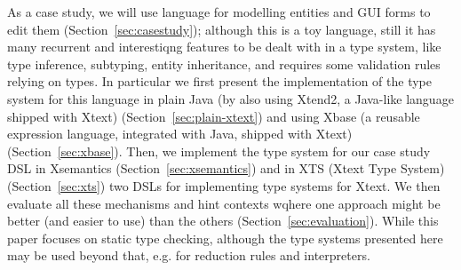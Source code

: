 As a case study, we will use language for modelling entities and GUI forms to
edit them (Section~\ref{sec:casestudy}); although this is a toy language, still
it has many recurrent and interestiqng features to be dealt with in a type
system, like type inference, subtyping, entity inheritance, and requires some
validation rules relying on types.  In particular we first present the
implementation of the type system for this language in plain Java (by also using
Xtend2, a Java-like language shipped with Xtext) (Section~\ref{sec:plain-xtext})
and using Xbase (a reusable expression language, integrated with Java, shipped
with Xtext) (Section~\ref{sec:xbase}).
Then, we implement the type system for our case study DSL in Xsemantics
(Section~\ref{sec:xsemantics}) and in XTS (Xtext Type System)
(Section~\ref{sec:xts}) two DSLs for implementing type systems for Xtext.
We then evaluate all these mechanisms and hint contexts wqhere one approach
might be better (and easier to use) than the others
(Section~\ref{sec:evaluation}).
While this paper focuses on static type checking, although the type systems
presented here may be used beyond that, e.g. for reduction rules and
interpreters.


